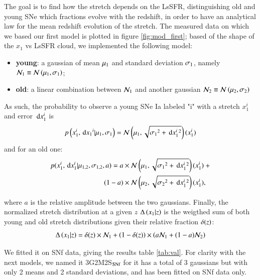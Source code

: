 \documentclass{aa}
\begin{document}
The goal is to find how the stretch depends on the LsSFR, distinguishing old and
young SNe which fractions evolve with the redshift, in order to have an
analytical law for the mean redshift evolution of the stretch. The measured data
on which we based our first model is plotted in figure \ref{fig:mod_first};
based of the shape of the $x_1$ vs LsSFR cloud, we implemented the following
model:
\begin{itemize}
    \item \textbf{young}: a gaussian of mean $\mu_1$ and standard deviation
        $\sigma_1$, namely $\mathcal{N}_1 \equiv \mathcal{N} \left(\mu_1,\sigma_1\right)$;
    \item \textbf{old}: a linear combination between $\mathcal{N}_1$ and another
        gaussian $\mathcal{N}_2 \equiv \mathcal{N} \left(\mu_2,\sigma_2\right)$
\end{itemize}
As such, the probability to observe a young SNe Ia labeled "i" with a stretch
$x_1^i$ and error $\,\mathrm{d} x_1^i$ is
\begin{equation}
    p \left(x_1^i, \,\mathrm{d} x_1{}^i|\mu_1,\sigma_1\right) = \mathcal{N} \left(\mu_1, \sqrt{\sigma_1{}^2 + \,\mathrm{d}
    x_1^i{}^2}\right)(x_1^i)
\end{equation}
and for an old one:
\begin{align}
    p(x_1^i, \,\mathrm{d} x_1^i | \mu_{1,2}, \sigma_{1,2}, a) = a & \times \mathcal{N} \left(\mu_1,
    \sqrt{\sigma_1{}^2 + \,\mathrm{d} x_1^i{}^{2}}\right) (x_1^i) \ + \\ (1-a) & \times \mathcal{N}
    \left(\mu_2, \sqrt{ \sigma_2{}^2 + \,\mathrm{d} x_1^i{}^{2}}\right) (x_1^i), \nonumber 
\end{align}

\noindent where $a$ is the relative amplitude between the two gaussians.
Finally, the normalized stretch distribution at a given $z$ $\Delta\left(x_1|z\right)$ is
the weigthed sum of both young and old stretch distributions given their
relative fraction $\delta(z)$:
\begin{equation}
    \Delta\left(x_1|z\right) = \delta(z)\times\mathcal{N}_1 +
    \left(1-\delta(z)\right) \times \left(a\mathcal{N}_1 + (1-a)\mathcal{N}_2\right)
\end{equation}

We fitted it on SNf data, giving the results table \ref{tab:val}. For clarity
with the next models, we named it 3G2M2S$_{\text{SNf}}$ for it has a total of 3
gaussians but with only 2 means and 2 standard deviations, and has been fitted
on SNf data only. 
\end{document}
